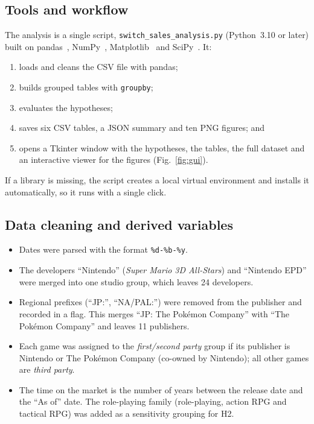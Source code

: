 \documentclass[conference]{IEEEtran}
\begin{document}
\subsection{Tools and workflow}
The analysis is a single script, \texttt{switch\_sales\_analysis.py} (Python~3.10 or later) built on pandas~\cite{pandas}, NumPy~\cite{numpy}, Matplotlib~\cite{mpl} and SciPy~\cite{scipy}. It:
\begin{enumerate}
  \item loads and cleans the CSV file with pandas;
  \item builds grouped tables with \texttt{groupby};
  \item evaluates the hypotheses;
  \item saves six CSV tables, a JSON summary and ten PNG figures; and
  \item opens a Tkinter window with the hypotheses, the tables, the full dataset and an interactive viewer for the figures (Fig.~\ref{fig:gui}).
\end{enumerate}
If a library is missing, the script creates a local virtual environment and installs it automatically, so it runs with a single click.

\subsection{Data cleaning and derived variables}
\begin{itemize}
  \item Dates were parsed with the format \texttt{\%d-\%b-\%y}.
  \item The developers ``Nintendo'' (\emph{Super Mario 3D All-Stars}) and ``Nintendo EPD'' were merged into one studio group, which leaves 24 developers.
  \item Regional prefixes (``JP:'', ``NA/PAL:'') were removed from the publisher and recorded in a flag. This merges ``JP: The Pokémon Company'' with ``The Pokémon Company'' and leaves 11 publishers.
  \item Each game was assigned to the \emph{first/second party} group if its publisher is Nintendo or The Pokémon Company (co-owned by Nintendo); all other games are \emph{third party}.
  \item The time on the market is the number of years between the release date and the ``As of'' date. The role-playing family (role-playing, action RPG and tactical RPG) was added as a sensitivity grouping for H2.
\end{itemize}
\end{document}
